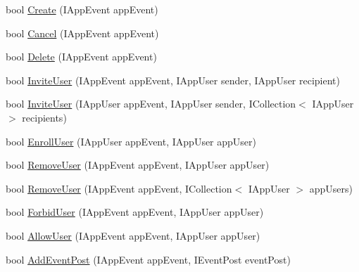 \begin{DoxyCompactItemize}
\item 
bool \hyperlink{class_bibabook_1_1_implementation_1_1_app_event_service_1_1_events_service_a3c3a0b4555e239f36e49615e3ca056cd}{Create} (I\+App\+Event app\+Event)
\item 
bool \hyperlink{class_bibabook_1_1_implementation_1_1_app_event_service_1_1_events_service_ae9d6dffe48aa929b26bac38dfb0c459a}{Cancel} (I\+App\+Event app\+Event)
\item 
bool \hyperlink{class_bibabook_1_1_implementation_1_1_app_event_service_1_1_events_service_a18493d649b2ea4c86428968f62eebcf5}{Delete} (I\+App\+Event app\+Event)
\item 
bool \hyperlink{class_bibabook_1_1_implementation_1_1_app_event_service_1_1_events_service_a03db2f4f2c7892f9a721c8fd58b86f45}{Invite\+User} (I\+App\+Event app\+Event, I\+App\+User sender, I\+App\+User recipient)
\item 
bool \hyperlink{class_bibabook_1_1_implementation_1_1_app_event_service_1_1_events_service_ab44fc0ac1b5abc5c1544943ebab32c80}{Invite\+User} (I\+App\+User app\+Event, I\+App\+User sender, I\+Collection$<$ I\+App\+User $>$ recipients)
\item 
bool \hyperlink{class_bibabook_1_1_implementation_1_1_app_event_service_1_1_events_service_a1eb61bcaade404a395c9b79ac9fa17e4}{Enroll\+User} (I\+App\+User app\+Event, I\+App\+User app\+User)
\item 
bool \hyperlink{class_bibabook_1_1_implementation_1_1_app_event_service_1_1_events_service_a640cf9c1a0dee37f7b320eded34d129d}{Remove\+User} (I\+App\+Event app\+Event, I\+App\+User app\+User)
\item 
bool \hyperlink{class_bibabook_1_1_implementation_1_1_app_event_service_1_1_events_service_a425edae1da002dcceeebd6bf65c316b0}{Remove\+User} (I\+App\+Event app\+Event, I\+Collection$<$ I\+App\+User $>$ app\+Users)
\item 
bool \hyperlink{class_bibabook_1_1_implementation_1_1_app_event_service_1_1_events_service_ab23587341dc178c31d1270ea2dc70a65}{Forbid\+User} (I\+App\+Event app\+Event, I\+App\+User app\+User)
\item 
bool \hyperlink{class_bibabook_1_1_implementation_1_1_app_event_service_1_1_events_service_ae1ace711340dc8ddda7a94a8740d3bda}{Allow\+User} (I\+App\+Event app\+Event, I\+App\+User app\+User)
\item 
bool \hyperlink{class_bibabook_1_1_implementation_1_1_app_event_service_1_1_events_service_a8c3fe9b4bbbc6185ef233b43f568a750}{Add\+Event\+Post} (I\+App\+Event app\+Event, I\+Event\+Post event\+Post)
\end{DoxyCompactItemize}


